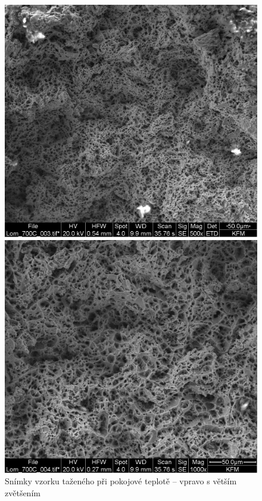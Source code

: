 \begin{figure}[!h]
    \centering
    \begin{minipage}[b]{0.48\linewidth}
        \centering
        \includegraphics[width=\linewidth]{A18 - SEM/Lom_700C_003.jpg}
    \end{minipage}
    \hfill
    \begin{minipage}[b]{0.48\linewidth}
        \centering
        \includegraphics[width=\linewidth]{A18 - SEM/Lom_700C_004.jpg} %
    \end{minipage}
    \caption{Snímky vzorku taženého při pokojové teplotě – vpravo s větším zvětšením}
    \label{fig:lom_700_combined}
\end{figure}


